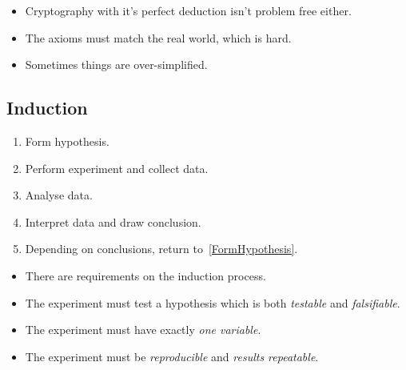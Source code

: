\begin{frame}
  \begin{remark}
    \begin{itemize}
      \item Cryptography with it's perfect deduction isn't problem free either.
      \item The axioms must match the real world, which is hard.
      \item Sometimes things are over-simplified.
    \end{itemize}
  \end{remark}
\end{frame}

\subsection{Induction}

\begin{frame}
  \begin{definition}
    \begin{enumerate}
      \item\label{FormHypothesis} Form hypothesis.
      \item Perform experiment and collect data.
      \item Analyse data.
      \item Interpret data and draw conclusion.
      \item Depending on conclusions, return to~\ref{FormHypothesis}.
    \end{enumerate}
  \end{definition}
\end{frame}

\begin{frame}
  \begin{remark}
    \begin{itemize}
      \item There are requirements on the induction process.
      \item The experiment must test a hypothesis which is both \emph{testable} 
        and \emph{falsifiable}.
      \item The experiment must have exactly \emph{one variable}.
      \item The experiment must be \emph{reproducible} and \emph{results 
          repeatable}.
    \end{itemize}
  \end{remark}
\end{frame}

